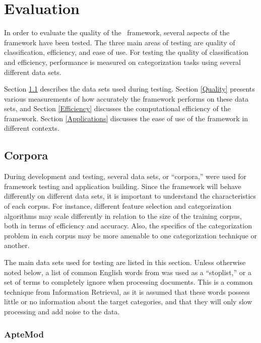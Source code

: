 \chapter{Evaluation}

In order to evaluate the quality of the \aicat\ framework, several
aspects of the framework have been tested.  The three main areas of
testing are quality of classification, efficiency, and ease of use.
For testing the quality of classification and efficiency, performance
is measured on categorization tasks using several different data sets.

Section \ref{Corpora} describes the data sets used during testing.
Section \ref{Quality} presents various measurements of how accurately
the framework performs on these data sets, and Section
\ref{Efficiency} discusses the computational efficiency of the
framework.  Section \ref{Applications} discusses the ease of use of
the framework in different contexts.


\section{Corpora}
\label{Corpora}

During development and testing, several data sets, or ``corpora,''
were used for framework testing and application building.  Since the
framework will behave differently on different data sets, it is
important to understand the characteristics of each corpus.  For
instance, different feature selection and categorization algorithms
may scale differently in relation to the size of the training corpus,
both in terms of efficiency and accuracy.\cite{chakrabarti:98} Also,
the specifics of the categorization problem in each corpus may be more
amenable to one categorization technique or another.

The main data sets used for testing are listed in this section.
Unless otherwise noted below, a list of common English words from
\cite{salton:89} was used as a ``stoplist,'' or a set of terms to
completely ignore when processing documents.  This is a common technique from
Information Retrieval,\cite{XXX-manning} as it is assumed that these words
possess little or no information about the target categories, and that
they will only slow processing and add noise to the data.


\subsection{ApteMod}


